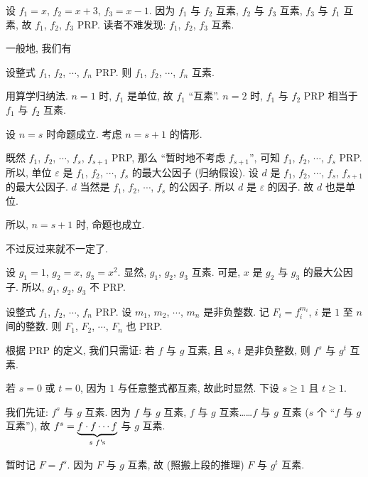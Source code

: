 \begin{example}
    设 $f_1 = x$, $f_2 = x + 3$, $f_3 = x - 1$. 因为 $f_1$ 与 $f_2$ 互素, $f_2$ 与 $f_3$ 互素, $f_3$ 与 $f_1$ 互素, 故 $f_1$, $f_2$, $f_3$ PRP. 读者不难发现: $f_1$, $f_2$, $f_3$ 互素.
\end{example}

一般地, 我们有
\begin{proposition}
    设整式 $f_1$, $f_2$, $\cdots$, $f_n$ PRP. 则 $f_1$, $f_2$, $\cdots$, $f_n$ 互素.
\end{proposition}

\begin{pf}
    用算学归纳法. $n = 1$ 时, $f_1$ 是单位, 故 $f_1$ ``互素''. $n = 2$ 时, $f_1$ 与 $f_2$ PRP 相当于 $f_1$ 与 $f_2$ 互素.

    设 $n = s$ 时命题成立. 考虑 $n = s + 1$ 的情形.

    既然 $f_1$, $f_2$, $\cdots$, $f_s$, $f_{s+1}$ PRP, 那么 ``暂时地不考虑 $f_{s+1}$'', 可知 $f_1$, $f_2$, $\cdots$, $f_s$ PRP. 所以, 单位 $\varepsilon$ 是 $f_1$, $f_2$, $\cdots$, $f_s$ 的最大公因子 (归纳假设). 设 $d$ 是 $f_1$, $f_2$, $\cdots$, $f_s$, $f_{s+1}$ 的最大公因子. $d$ 当然是 $f_1$, $f_2$, $\cdots$, $f_s$ 的公因子. 所以 $d$ 是 $\varepsilon$ 的因子. 故 $d$ 也是单位.

    所以, $n = s + 1$ 时, 命题也成立.
\end{pf}

不过反过来就不一定了.

\begin{example}
    设 $g_1 = 1$, $g_2 = x$, $g_3 = x^2$. 显然, $g_1$, $g_2$, $g_3$ 互素. 可是, $x$ 是 $g_2$ 与 $g_3$ 的最大公因子. 所以, $g_1$, $g_2$, $g_3$ 不 PRP.
\end{example}

\begin{proposition}
    设整式 $f_1$, $f_2$, $\cdots$, $f_n$ PRP. 设 $m_1$, $m_2$, $\cdots$, $m_n$ 是非负整数. 记 $F_i = f_i^{m_i}$, $i$ 是 $1$ 至 $n$ 间的整数. 则 $F_1$, $F_2$, $\cdots$, $F_n$ 也 PRP.
\end{proposition}

\begin{pf}
    根据 PRP 的定义, 我们只需证: 若 $f$ 与 $g$ 互素, 且 $s$, $t$ 是非负整数, 则 $f^s$ 与 $g^t$ 互素.

    若 $s = 0$ 或 $t = 0$, 因为 $1$ 与任意整式都互素, 故此时显然. 下设 $s \geq 1$ 且 $t \geq 1$.

    我们先证: $f^s$ 与 $g$ 互素. 因为 $f$ 与 $g$ 互素, $f$ 与 $g$ 互素……$f$ 与 $g$ 互素 ($s$ 个 ``$f$ 与 $g$ 互素''), 故 $f^s = \underbrace{f \cdot f \cdots f}_{\text{$s$ $f$\apostrophe s}}$ 与 $g$ 互素.

    暂时记 $F = f^s$. 因为 $F$ 与 $g$ 互素, 故 (照搬上段的推理) $F$ 与 $g^t$ 互素.
\end{pf}

